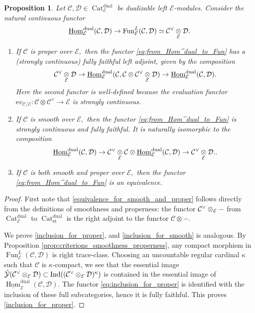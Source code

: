 \documentclass[11pt,leqno]{amsart}
\newtheorem{prop}[theo]{Proposition}
\numberwithin{equation}{section}
\def\Hom{\operatorname{Hom}}
\newcommand{\tens}[1]{%
  \mathbin{\mathop{\otimes}\displaylimits_{#1}}%
}
\newcommand{\Cat}{\operatorname{Cat}}
\newcommand{\st}{\operatorname{st}}
\newcommand{\dual}{\operatorname{dual}}
\newcommand{\ev}{\mathrm ev}
\newcommand{\cD}{{\mathcal D}}
\newcommand{\cC}{{\mathcal C}}
\newcommand{\cE}{{\mathcal E}}
\newcommand{\cY}{{\mathcal Y}}
\newcommand{\un}{\underline}
\newcommand{\Fun}{\operatorname{Fun}}
\newcommand{\Ind}{\operatorname{Ind}}
\begin{document}
\begin{prop}\label{prop:Hom^dual_from_proper_or_smooth}
Let $\cC,\cD\in\Cat_{\cE}^{\dual}$ be dualizable left $\cE$-modules. Consider the natural continuous functor
\begin{equation}\label{eq:from_Hom^dual_to_Fun}
\un{\Hom}_{\cE}^{\dual}(\cC,\cD)\to \Fun_{\cE}^L(\cC,\cD)\simeq\cC^{\vee}\tens{\cE}\cD.
\end{equation}
\begin{enumerate}[label=(\roman*),ref=(\roman*)]
\item If $\cC$ is proper over $\cE,$ then the functor \eqref{eq:from_Hom^dual_to_Fun} has a (strongly continuous) fully faithful left adjoint, given by the composition 
\begin{equation}\label{eq:inclusion_for_proper}
	\cC^{\vee}\tens{\cE}\cD\to \un{\Hom}_{\cE}^{\dual}(\cC,\cC\otimes\cC^{\vee}\tens{\cE}\cD)\to\un{\Hom}_{\cE}^{\dual}(\cC,\cD).
\end{equation}
Here the second functor is well-defined because the evaluation functor $\ev_{\cC/\cE}:\cC\otimes\cC^{\vee}\to\cE$ is strongly continuous.  \label{inclusion_for_proper}
\item  If $\cC$ is smooth over $\cE,$ then the functor \eqref{eq:from_Hom^dual_to_Fun} is strongly continuous and fully faithful. It is naturally isomorphic to the composition 
\begin{equation*}\label{eq:inclusion_for_smooth}
\un{\Hom}_{\cE}^{\dual}(\cC,\cD)\to \cC^{\vee}\tens{\cE}\cC\otimes \un{\Hom}_{\cE}^{\dual}(\cC,\cD)\to \cC^{\vee}\tens{\cE}\cD. .
\end{equation*} \label{inclusion_for_smooth}
\item If $\cC$ is both smooth and proper over $\cE,$ then the functor \eqref{eq:from_Hom^dual_to_Fun} is an equivalence. \label{equivalence_for_smooth_and_proper}
\end{enumerate}
\end{prop}

\begin{proof} First note that \ref{equivalence_for_smooth_and_proper} follows directly from the definitions of smoothness and properness: the functor $\cC^{\vee}\tens{\cE}-$ from $\Cat_{\cE}^{\dual}$ to $\Cat_{\st}^{\dual}$ is the right adjoint to the functor $\cC\otimes-.$
	
 We prove \ref{inclusion_for_proper}, and \ref{inclusion_for_smooth} is analogous. By Proposition \ref{prop:criterions_smoothness_properness}, any compact morphism in $\Fun^L_{\cE}(\cC,\cD)$ is right trace-class. Choosing an uncountable regular cardinal $\kappa$ such that $\cC$ is $\kappa$-compact, we see that the essential image $\hat{\cY}(\cC^{\vee}\tens{\cE}\cD)\subset \Ind((\cC^{\vee}\tens{\cE}\cD)^{\kappa})$ is contained in the essential image of $\un{\Hom}_{\cE}^{\dual}(\cC,\cD).$ The functor \eqref{eq:inclusion_for_proper} is identified with the inclusion of these full subcategories, hence it is fully faithful. This proves \ref{inclusion_for_proper}.
\end{proof}
\end{document}
